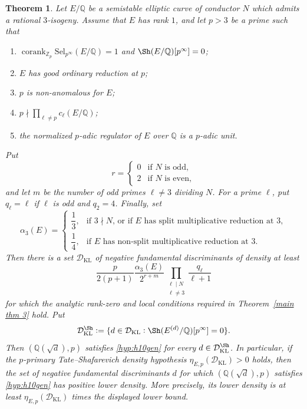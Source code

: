 \documentclass[12pt]{amsart}
\newtheorem{theorem}{Theorem}[section]
\newcommand{\Z}{\mathbb{Z}}
\newcommand{\Q}{\mathbb{Q}}
\newcommand{\Sel}{\mathrm{Sel}}
\newcommand{\op}[1]{\operatorname{#1}}
\numberwithin{equation}{section}
\begin{document}
\begin{theorem}\label{thm:3-kriz-li}
Let $E/\Q$ be a semistable elliptic curve of conductor $N$ which admits a rational $3$-isogeny. Assume that $E$ has rank $1$, and let $p>3$ be a prime such that
\begin{enumerate}
    \item $\op{corank}_{\Z_p}\Sel_{p^\infty}(E/\Q)=1$ and $\Sh(E/\Q)[p^\infty]=0$;
    \item $E$ has good ordinary reduction at $p$;
    \item $p$ is non-anomalous for $E$;
    \item $p\nmid\prod_{\ell\neq p}c_\ell(E/\Q)$;
    \item the normalized $p$-adic regulator of $E$ over $\Q$ is a $p$-adic unit.
\end{enumerate}
Put
\[
 r=
 \begin{cases}
 0 & \text{if $N$ is odd},\\
 2 & \text{if $N$ is even},
 \end{cases}
\]
and let $m$ be the number of odd primes $\ell\neq3$ dividing $N$. For a prime $\ell$, put $q_\ell=\ell$ if $\ell$ is odd and $q_2=4$. Finally, set
\[
 \alpha_3(E)=
 \begin{cases}
 \dfrac{1}{3},
 & \text{if $3\nmid N$, or if $E$ has split multiplicative reduction at $3$},\\[6pt]
 \dfrac{1}{4},
 & \text{if $E$ has non-split multiplicative reduction at $3$}.
 \end{cases}
\]
Then there is a set $\mathcal D_{\mathrm{KL}}$ of negative fundamental discriminants of density at least
\[
 \frac{p}{2(p+1)}
 \frac{\alpha_3(E)}{2^{r+m}}
 \prod_{\substack{\ell\mid N\\ \ell\neq3}}
 \frac{q_\ell}{\ell+1}
\]
for which the analytic rank-zero and local conditions required in Theorem~\ref{main thm 3} hold. Put
\[
\mathcal D_{\mathrm{KL}}^{\Sh}
:=
\{d\in\mathcal D_{\mathrm{KL}}:\Sh(E^{(d)}/\Q)[p^\infty]=0\}.
\]
Then $(\Q(\sqrt d),p)$ satisfies \eqref{hyp:h10gen} for every $d\in\mathcal D_{\mathrm{KL}}^{\Sh}$. In particular, if the $p$-primary Tate--Shafarevich density hypothesis $\eta_{E,p}(\mathcal D_{\mathrm{KL}})>0$ holds, then the set of negative fundamental discriminants $d$ for which $(\Q(\sqrt d),p)$ satisfies \eqref{hyp:h10gen} has positive lower density. More precisely, its lower density is at least $\eta_{E,p}(\mathcal D_{\mathrm{KL}})$ times the displayed lower bound.
\end{theorem}
\end{document}
